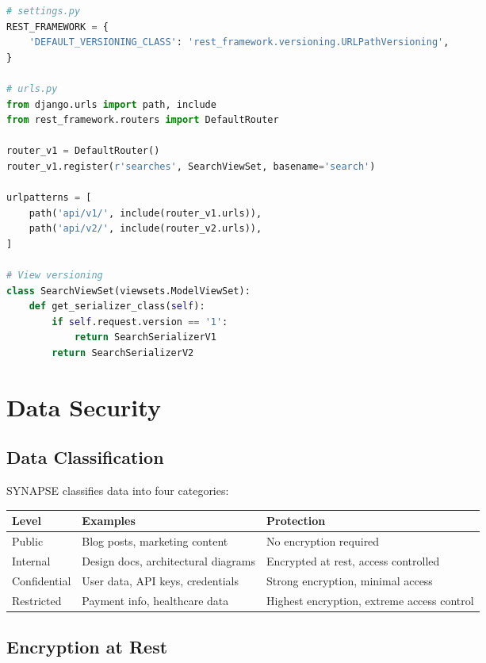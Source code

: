 \documentclass{report}
\begin{document}
\begin{lstlisting}[language=Python]
# settings.py
REST_FRAMEWORK = {
    'DEFAULT_VERSIONING_CLASS': 'rest_framework.versioning.URLPathVersioning',
}

# urls.py
from django.urls import path, include
from rest_framework.routers import DefaultRouter

router_v1 = DefaultRouter()
router_v1.register(r'searches', SearchViewSet, basename='search')

urlpatterns = [
    path('api/v1/', include(router_v1.urls)),
    path('api/v2/', include(router_v2.urls)),
]

# View versioning
class SearchViewSet(viewsets.ModelViewSet):
    def get_serializer_class(self):
        if self.request.version == '1':
            return SearchSerializerV1
        return SearchSerializerV2
\end{lstlisting}


\chapter{Data Security}

\section{Data Classification}

SYNAPSE classifies data into four categories:

\begin{table}[h]
\centering
\small
\begin{tabular}{|l|p{2.5cm}|p{3.5cm}|}
\hline
\textbf{Level} & \textbf{Examples} & \textbf{Protection} \\
\hline
Public & Blog posts, marketing content & No encryption required \\
\hline
Internal & Design docs, architectural diagrams & Encrypted at rest, access controlled \\
\hline
Confidential & User data, API keys, credentials & Strong encryption, minimal access \\
\hline
Restricted & Payment info, healthcare data & Highest encryption, extreme access control \\
\hline
\end{tabular}
\end{table}

\section{Encryption at Rest}
\end{document}
